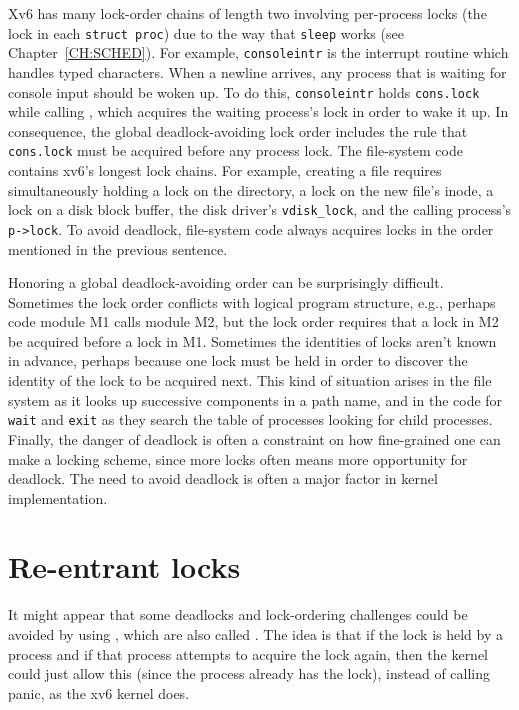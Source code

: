 Xv6 has many lock-order chains of length two involving
per-process locks
(the lock in each
\lstinline{struct proc})
due to the way that
\lstinline{sleep}
works (see Chapter~\ref{CH:SCHED}).
For example,
\lstinline{consoleintr}
is the interrupt routine which handles typed characters.
When a newline arrives, any process that is waiting for
console input should be woken up.
To do this,
\lstinline{consoleintr}
holds
\lstinline{cons.lock}
while calling 
,
which acquires 
the waiting process's lock in order to wake it up.
In consequence, the global deadlock-avoiding
lock order includes the rule that
\lstinline{cons.lock}
must be acquired before any process lock.
The file-system code contains xv6's longest lock chains.
For example, creating a file requires simultaneously
holding a lock on the directory, a lock on the new file's inode,
a lock on a disk block buffer, 
the disk driver's \lstinline{vdisk_lock},
and
the calling process's \lstinline{p->lock}.
To avoid deadlock, file-system code always acquires locks in the order
mentioned in the previous sentence.

Honoring a global deadlock-avoiding order can be surprisingly
difficult. Sometimes the lock order conflicts with logical program
structure, e.g., perhaps code module M1 calls module M2, but the lock
order requires that a lock in M2 be acquired before a lock in M1.
Sometimes the identities of locks aren't known in advance, perhaps
because one lock must be held in order to discover the identity
of the lock to be acquired next. This kind of situation arises in the
file system as it looks up successive components in a path name, and
in the code for {\tt wait} and {\tt exit} as they search the table of
processes looking for child processes. Finally, the danger of deadlock
is often a constraint on how fine-grained one can make a locking
scheme, since more locks often means more opportunity for deadlock.
The need to avoid deadlock is often a major factor in kernel
implementation.

\section{Re-entrant locks}

It might appear that some deadlocks and lock-ordering challenges could
be avoided by using , which are also
called .  The idea is that if the lock is held
by a process and if that process attempts to acquire the lock again,
then the kernel could just allow this (since the process already has
the lock), instead of calling panic, as the xv6 kernel does.

